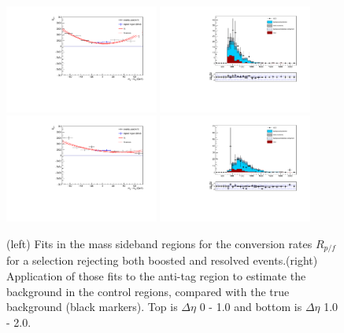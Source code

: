 \begin{figure}[h]
\centering
\includegraphics[width=0.45\textwidth]{F5/HH4b2p1SR_Fit_BG_boostres_dEta0_MCSR.pdf}
\includegraphics[width=0.45\textwidth]{F5/HH4b2p1_Plot_BG_boostres_dEta0_MCSR.pdf}\\
\includegraphics[width=0.45\textwidth]{F5/HH4b2p1SR_Fit_BG_boostres_dEta1_MCSR.pdf}
\includegraphics[width=0.45\textwidth]{F5/HH4b2p1_Plot_BG_boostres_dEta1_MCSR.pdf}
\caption{(left) Fits in the mass sideband regions for the conversion rates $R_{p/f}$ for a selection rejecting both boosted and resolved events.(right) Application of those fits to the anti-tag region to estimate the background in the control regions, compared with the true background (black markers). Top is $\Delta\eta$ 0 - 1.0 and bottom is $\Delta\eta$ 1.0 - 2.0.}
\label{fig:closureMC3}
\end{figure}


